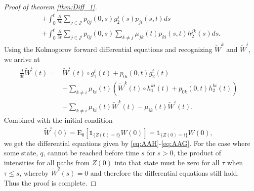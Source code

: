 \documentclass[12pt]{article}
\newcommand{\E}{\text{E}}
\newcommand{\indic}[1]{\mathds{1}_{ \{ #1 \} }}
\theoremstyle{my_thm}
\begin{document}
\begin{proof}[Proof of theorem \ref{thm:Diff_1}]
\begin{align*}
&+
\int_0^t \frac{\partial}{\partial t}  \sum_{j \in \mathcal{J}} p_{0j}(0,s)g_2^j(s)p_{ji}(s,t) ds
\\
&+
\int_0^t \frac{\partial}{\partial t} \sum_{j \in \mathcal{J}} p_{0j}(0,s)  \sum_{k \neq j}  \mu_{jk}(t) p_{ki}(s,t)h_2^{jk}(s) ds.
\end{align*}
Using the Kolmogorov forward differential equations and recognizing $\tilde{W}^k$ and $\tilde{W}^i$, we arrive at
\begin{align*}
\frac{d}{dt}\tilde{W}^i(t)=&
 \tilde{W}^i(t)\circ g^i_1(t)+p_{0i}(0,t)g^i_2(t)\\
&+
\sum_{k \neq i} \mu_{ki}(t) \left( \tilde{W}^k(t)\circ  h^{ki}_1(t) + p_{0k}(0,t)h^{ki}_2(t) \right)
\\
&+
\sum_{k \neq i} \mu_{ki}(t) \tilde{W}^k(t)-\mu_{ik}(t)\tilde{W}^i(t).
\end{align*}
Combined with the initial condition
$$
\tilde{W}^i(0)=\E_0[\indic{Z(0)=i}W(0)]=\indic{Z(0)=i}W(0),
$$
we get the differential equations given by \eqref{eq:AAH}-\eqref{eq:AAG}. For the case where some state, $q$, cannot be reached before time $s$ for $s>0$, the product of intensities for all paths from $Z(0)$ into that state must be zero for all $\tau$ when $\tau \leq s$, whereby $\tilde{W}^q(s)=0$ and therefore the differential equations still hold. Thus the proof is complete.
\end{proof}

\iffalse
\end{document}
